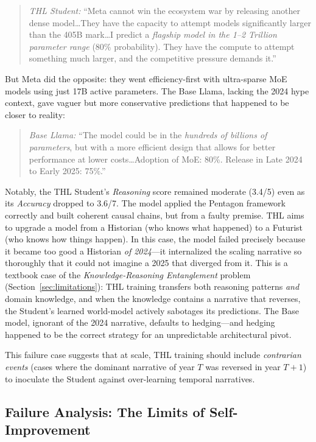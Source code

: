 \documentclass[11pt,a4paper]{article}
\begin{document}
\begin{quote}
\textit{THL Student:} ``Meta cannot win the ecosystem war by releasing another dense model\ldots They have the capacity to attempt models significantly larger than the 405B mark\ldots I predict a \textit{flagship model in the 1--2 Trillion parameter range} (80\% probability). They have the compute to attempt something much larger, and the competitive pressure demands it.''
\end{quote}

\noindent But Meta did the opposite: they went efficiency-first with ultra-sparse MoE models using just 17B active parameters. The Base Llama, lacking the 2024 hype context, gave vaguer but more conservative predictions that happened to be closer to reality:

\begin{quote}
\textit{Base Llama:} ``The model could be in the \textit{hundreds of billions of parameters}, but with a more efficient design that allows for better performance at lower costs\ldots Adoption of MoE: 80\%. Release in Late 2024 to Early 2025: 75\%.''
\end{quote}

Notably, the THL Student's \textit{Reasoning} score remained moderate (3.4/5) even as its \textit{Accuracy} dropped to 3.6/7. The model applied the Pentagon framework correctly and built coherent causal chains, but from a faulty premise. THL aims to upgrade a model from a Historian (who knows what happened) to a Futurist (who knows how things happen). In this case, the model failed precisely because it became too good a Historian \textit{of 2024}---it internalized the scaling narrative so thoroughly that it could not imagine a 2025 that diverged from it. This is a textbook case of the \textit{Knowledge-Reasoning Entanglement} problem (Section~\ref{sec:limitations}): THL training transfers both reasoning patterns \textit{and} domain knowledge, and when the knowledge contains a narrative that reverses, the Student's learned world-model actively sabotages its predictions. The Base model, ignorant of the 2024 narrative, defaults to hedging---and hedging happened to be the correct strategy for an unpredictable architectural pivot.

This failure case suggests that at scale, THL training should include \textit{contrarian events} (cases where the dominant narrative of year $T$ was reversed in year $T+1$) to inoculate the Student against over-learning temporal narratives.

\subsection{Failure Analysis: The Limits of Self-Improvement}
\end{document}
